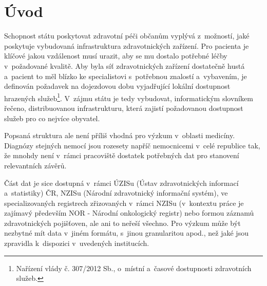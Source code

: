 \documentclass[11pt, draft, oneside]{fithesis2}
\begin{document}
\MainMatter

\tableofcontents



\chapter{Úvod}
Schopnost státu poskytovat zdravotní péči občanům vyplývá z~možností, jaké poskytuje vybudovaná infrastruktura zdravotnických zařízení. Pro pacienta je klíčové jakou vzdálenost musí urazit, aby se mu dostalo potřebné léčby v~požadované kvalitě. Aby byla síť zdravotnických zařízení dostatečně hustá a~pacient to měl blízko ke specialistovi s~potřebnou znalostí a~vybavením, je definován požadavek na dojezdovou dobu vyjadřující lokální dostupnost hrazených služeb\footnote{Nařízení vlády č. 307/2012 Sb., o~místní a~časové dostupnosti zdravotních služeb.}. V~zájmu státu je tedy vybudovat, informatickým slovníkem řečeno, distribuovanou infrastrukturu, která zajistí požadovanou dostupnost služeb pro co nejvíce obyvatel. 

Popsaná struktura ale není příliš vhodná pro výzkum v~oblasti medicíny. Diagnózy stejných nemocí jsou rozesety napříč nemocnicemi v~celé republice tak, že mnohdy není v~rámci pracoviště dostatek potřebných dat pro stanovení relevantních závěrů.

Část dat je sice dostupná v~rámci ÚZISu (Ústav zdravotnických informací a~statistiky) ČR, NZISu (Národní zdravotnický informační systém), ve specializovaných registrech zřizovaných v~rámci NZISu (v~kontextu práce je zajímavý především NOR - Národní onkologický registr) nebo formou záznamů zdravotnických pojišťoven, ale ani to neřeší všechno. Pro výzkum může být nezbytné mít data v~jiném formátu, s~jinou granularitou apod., než jaké jsou zpravidla k~dispozici v~uvedených institucích.  
\end{document}
